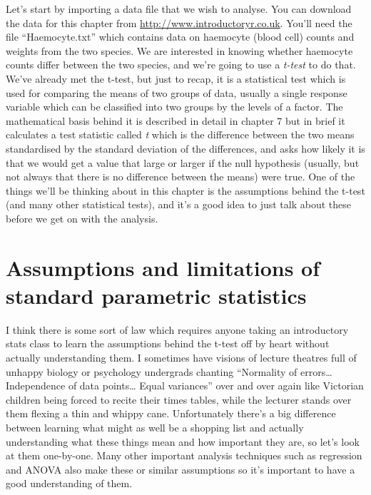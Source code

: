 \documentclass[
]{book}
\begin{document}
Let's start by importing a data file that we wish to analyse. You can download the data for this chapter from \url{http://www.introductoryr.co.uk}. You'll need the file ``Haemocyte.txt'' which contains data on haemocyte (blood cell) counts and weights from the two species. We are interested in knowing whether haemocyte counts differ between the two species, and we're going to use a \emph{t-test} to do that. We've already met the t-test, but just to recap, it is a statistical test which is used for comparing the means of two groups of data, usually a single response variable which can be classified into two groups by the levels of a factor. The mathematical basis behind it is described in detail in chapter 7 but in brief it calculates a test statistic called \emph{t} which is the difference between the two means standardised by the standard deviation of the differences, and asks how likely it is that we would get a value that large or larger if the null hypothesis (usually, but not always that there is no difference between the means) were true. One of the things we'll be thinking about in this chapter is the assumptions behind the t-test (and many other statistical tests), and it's a good idea to just talk about these before we get on with the analysis.

\hypertarget{assumptions-and-limitations-of-standard-parametric-statistics}{%
\section{Assumptions and limitations of standard parametric statistics}\label{assumptions-and-limitations-of-standard-parametric-statistics}}

I think there is some sort of law which requires anyone taking an introductory stats class to learn the assumptions behind the t-test off by heart without actually understanding them. I sometimes have visions of lecture theatres full of unhappy biology or psychology undergrads chanting ``Normality of errors\ldots{} Independence of data points\ldots{} Equal variances'' over and over again like Victorian children being forced to recite their times tables, while the lecturer stands over them flexing a thin and whippy cane. Unfortunately there's a big difference between learning what might as well be a shopping list and actually understanding what these things mean and how important they are, so let's look at them one-by-one. Many other important analysis techniques such as regression and ANOVA also make these or similar assumptions so it's important to have a good understanding of them.
\end{document}
